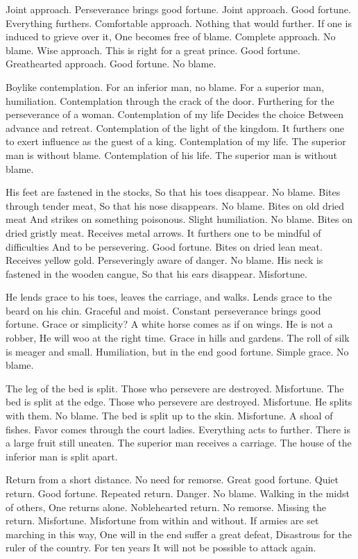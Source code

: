 {Joint approach.
 Perseverance brings good fortune.}
{Joint approach.
 Good fortune.
 Everything furthers.}
{Comfortable approach.
 Nothing that would further.
 If one is induced to grieve over it,
 One becomes free of blame.}
{Complete approach.
 No blame.}
{Wise approach.
 This is right for a great prince.
 Good fortune.}
{Greathearted approach.
 Good fortune. No blame.}

{Boylike contemplation.
 For an inferior man, no blame.
 For a superior man, humiliation.}
{Contemplation through the crack of the door.
 Furthering for the perseverance of a woman.}
{Contemplation of my life
 Decides the choice
 Between advance and retreat.}
{Contemplation of the light of the kingdom.
 It furthers one to exert influence as the guest of a king.}
{Contemplation of my life.
 The superior man is without blame.}
{Contemplation of his life.
 The superior man is without blame.}

{His feet are fastened in the stocks,
 So that his toes disappear.
 No blame.}
{Bites through tender meat,
 So that his nose disappears.
 No blame.}
{Bites on old dried meat
 And strikes on something poisonous.
 Slight humiliation. No blame.}
{Bites on dried gristly meat.
 Receives metal arrows.
 It furthers one to be mindful of difficulties
 And to be persevering.
 Good fortune.}
{Bites on dried lean meat.
 Receives yellow gold.
 Perseveringly aware of danger.
 No blame.}
{His neck is fastened in the wooden cangue,
 So that his ears disappear.
 Misfortune.}

{He lends grace to his toes, leaves the carriage, and walks.}
{Lends grace to the beard on his chin.}
{Graceful and moist.
 Constant perseverance brings good fortune.}
{Grace or simplicity?
 A white horse comes as if on wings.
 He is not a robber,
 He will woo at the right time.}
{Grace in hills and gardens.
 The roll of silk is meager and small.
 Humiliation, but in the end good fortune.}
{Simple grace. No blame.}

{The leg of the bed is split.
 Those who persevere are destroyed.
 Misfortune.}
{The bed is split at the edge.
 Those who persevere are destroyed.
 Misfortune.}
{He splits with them. No blame.}
{The bed is split up to the skin.
 Misfortune.}
{A shoal of fishes. Favor comes through the court ladies.
 Everything acts to further.}
{There is a large fruit still uneaten.
 The superior man receives a carriage.
 The house of the inferior man is split apart.}

{Return from a short distance.
 No need for remorse.
 Great good fortune.}
{Quiet return. Good fortune.}
{Repeated return. Danger. No blame.}
{Walking in the midst of others,
 One returns alone.}
{Noblehearted return. No remorse.}
{Missing the return. Misfortune.
 Misfortune from within and without.
 If armies are set marching in this way,
 One will in the end suffer a great defeat,
 Disastrous for the ruler of the country.
 For ten years
 It will not be possible to attack again.}

